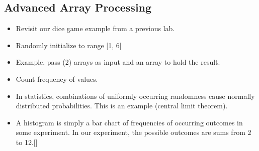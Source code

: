 \documentclass[11pt]{article}
\begin{document}
\subsection{Advanced Array Processing}
\label{sec-3-2}
\begin{itemize}
\item Revisit our dice game example from a previous lab.
\item Randomly initialize to range [1, 6]
\item Example, pass (2) arrays as input and an array to hold the result.
\item Count frequency of values.
\item In statistics, combinations of uniformly occurring randomness cause 
normally distributed probabilities.  This is an example (central limit
theorem).
\item A histogram is simply a bar chart of frequencies of occurring
outcomes in some experiment.  In our experiment, the possible
outcomes are sums from 2 to 12.[]
\end{itemize}
\end{document}
